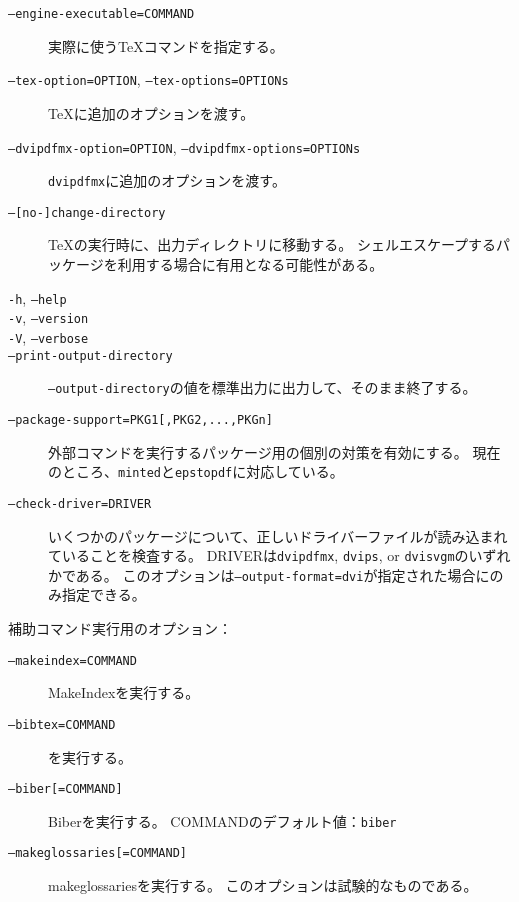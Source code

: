 \documentclass[a4paper]{ltjsreport}
\newcommand\metavar[1]{\textsf{#1}}
\begin{document}
\begin{description}
\item[\texttt{--engine-executable=\metavar{COMMAND}}]
  実際に使う\TeX{}コマンドを指定する。
\item[\texttt{--tex-option=\metavar{OPTION}}, \texttt{--tex-options=\metavar{OPTIONs}}]
  \TeX{}に追加のオプションを渡す。
\item[\texttt{--dvipdfmx-option=\metavar{OPTION}}, \texttt{--dvipdfmx-options=\metavar{OPTIONs}}]
  \texttt{dvipdfmx}に追加のオプションを渡す。
\item[\texttt{--[no-]change-directory}]
  \TeX{}の実行時に、出力ディレクトリに移動する。
  シェルエスケープするパッケージを利用する場合に有用となる可能性がある。
\item[\texttt{-h}, \texttt{--help}]
\item[\texttt{-v}, \texttt{--version}]
\item[\texttt{-V}, \texttt{--verbose}]
\item[\texttt{--print-output-directory}]
  \texttt{--output-directory}の値を標準出力に出力して、そのまま終了する。
\item[\texttt{--package-support=PKG1[,PKG2,...,PKGn]}]
  外部コマンドを実行するパッケージ用の個別の対策を有効にする。
  現在のところ、\texttt{minted}と\texttt{epstopdf}に対応している。
\item[\texttt{--check-driver=DRIVER}]
  いくつかのパッケージについて、正しいドライバーファイルが読み込まれていることを検査する。
  \metavar{DRIVER}は\texttt{dvipdfmx}, \texttt{dvips}, or \texttt{dvisvgm}のいずれかである。
  このオプションは\texttt{--output-format=dvi}が指定された場合にのみ指定できる。
\end{description}

補助コマンド実行用のオプション：
\begin{description}
\item[\texttt{--makeindex=\metavar{COMMAND}}]
  MakeIndexを実行する。
\item[\texttt{--bibtex=\metavar{COMMAND}}]
  \BibTeX{}を実行する。
\item[\texttt{--biber[=\metavar{COMMAND}]}]
  Biberを実行する。
  \metavar{COMMAND}のデフォルト値：\texttt{biber}
\item[\texttt{--makeglossaries[=\metavar{COMMAND}]}]
  makeglossariesを実行する。
  このオプションは試験的なものである。
\end{description}
\end{document}
